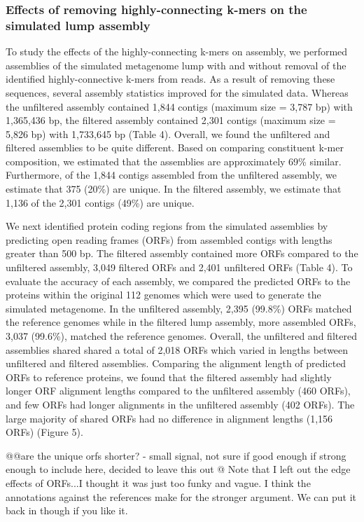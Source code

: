 \documentclass[11pt]{article} %
\begin{document}
\subsubsection{Effects of removing highly-connecting k-mers on the simulated lump assembly}
To study the effects of the highly-connecting k-mers on assembly, we performed assemblies of the simulated metagenome lump with and without removal of the identified highly-connective k-mers from reads.  As a result of removing these sequences, several assembly statistics improved for the simulated data.  Whereas the unfiltered assembly contained 1,844 contigs (maximum size = 3,787 bp) with 1,365,436 bp, the filtered assembly contained 2,301 contigs (maximum size = 5,826 bp) with 1,733,645 bp (Table 4).  Overall, we found the unfiltered and filtered assemblies to be quite different.  Based on comparing constituent k-mer composition, we estimated that the assemblies are approximately 69\% similar.  Furthermore, of the 1,844 contigs assembled from the unfiltered assembly, we estimate that 375 (20\%) are unique.  In the filtered assembly, we estimate that 1,136 of the 2,301 contigs (49\%) are unique. 
	
We next identified protein coding regions from the simulated assemblies by predicting open reading frames (ORFs) from assembled contigs with lengths greater than 500 bp.  The filtered assembly contained more ORFs compared to the unfiltered assembly, 3,049 filtered ORFs and 2,401 unfiltered ORFs (Table 4).  To evaluate the accuracy of each assembly, we compared the predicted ORFs to the proteins within the original 112 genomes which were used to generate the simulated metagenome.  In the unfiltered assembly, 2,395 (99.8\%) ORFs matched the reference genomes while in the filtered lump assembly, more assembled ORFs, 3,037 (99.6\%), matched the reference genomes.  Overall, the unfiltered and filtered assemblies shared shared a total of 2,018 ORFs which varied in lengths between unfiltered and filtered assemblies.  Comparing the alignment length of predicted ORFs to reference proteins, we found that the filtered assembly had slightly longer ORF alignment lengths compared to the unfiltered assembly (460 ORFs), and few ORFs had longer alignments in the unfiltered assembly (402 ORFs).  The large majority of shared ORFs had no difference in alignment lengths (1,156 ORFs) (Figure 5).  

@@are the unique orfs shorter? - small signal, not sure if good enough if strong enough to include here, decided to leave this out
@ Note that I left out the edge effects of ORFs...I thought it was just too funky and vague.  I think the annotations against the references make for the stronger argument.  We can put it back in though if you like it.
\end{document}
